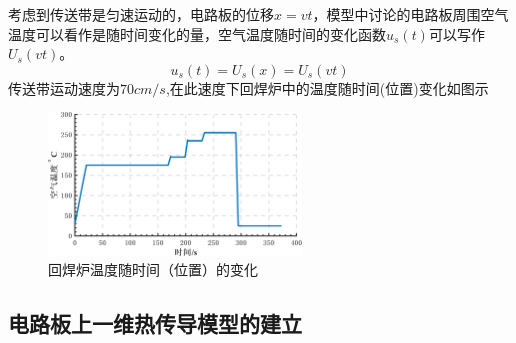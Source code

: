 \documentclass[withoutpreface,bwprint]{cumcmthesis} %
\begin{document}
	考虑到传送带是匀速运动的，电路板的位移$x=vt$，模型中讨论的电路板周围空气温度可以看作是随时间变化的量，空气温度随时间的变化函数$u_s(t)$可以写作$U_s(vt)$。
	\begin{equation}\label{vt}
	u_s(t)=U_s(x)=U_s(vt)
	\end{equation}
	传送带运动速度为$70cm/s$,在此速度下回焊炉中的温度随时间(位置)变化如图示
	\begin{figure}[H]
		\centering
		\includegraphics[width=0.6\textwidth]{空气温度趋势图.png}
		\caption{回焊炉温度随时间（位置）的变化}\label{空气温度趋势图}
	\end{figure}
	
	\subsection{电路板上一维热传导模型的建立}
	
\end{document}
